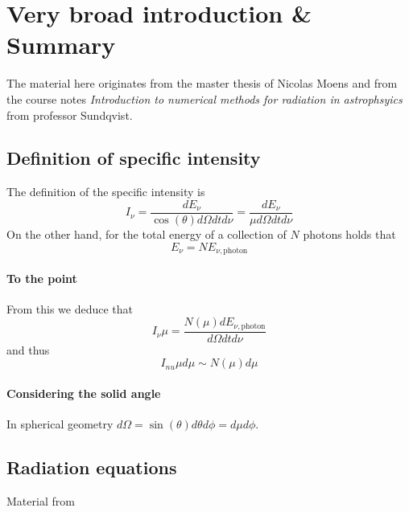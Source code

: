 \documentclass[../main/main.tex]{subfiles}
\begin{document}
\section{Very broad introduction \& Summary}
The material here originates from the master thesis of Nicolas Moens \cite{MoensNicolas} and from the course notes \textit{Introduction to numerical methods for radiation in astrophsyics} from professor Sundqvist. 

\subsection{Definition of specific intensity}
\label{specific_intensity}
The definition of the specific intensity is 
\begin{equation}
I_{\nu} 
	= \frac{dE_{\nu}}{\cos(\theta) d\Omega dt d\nu} 
	= \frac{dE_{\nu}}{\mu d\Omega dt d\nu} 
\end{equation}
On the other hand, for the total energy of a collection of $N$ photons holds that 
\begin{equation}
E_{\nu} = N E_{\nu,\text{photon}} 
\end{equation}

\paragraph{To the point}
From this we deduce that 
\begin{equation}
I_{\nu} \mu  = \frac{N(\mu) dE_{\nu,\text{photon}}}{d\Omega dt d\nu}
\end{equation}
and thus 
\begin{equation}
\boxed{I_{nu} \mu d\mu \sim N(\mu) d\mu}
\end{equation}

\paragraph{Considering the solid angle}
In spherical geometry $d\Omega = \sin(\theta) d\theta d\phi = d\mu d\phi$.

\subsection{Radiation equations}
Material from \cite{TheoryStellarAtmospheres2014}
\end{document}
